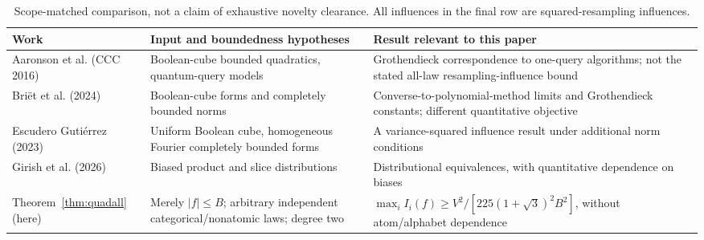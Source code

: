 \documentclass[11pt]{article}
\numberwithin{equation}{section}
\theoremstyle{remark}
\begin{document}
\begin{table}[ht]
\centering\footnotesize
\begin{tabular}{@{}>{\raggedright\arraybackslash}p{.235\linewidth}>{\raggedright\arraybackslash}p{.31\linewidth}>{\raggedright\arraybackslash}p{.355\linewidth}@{}}\toprule
Work & Input and boundedness hypotheses & Result relevant to this paper\\\midrule
Aaronson et al. (CCC 2016)~\cite{AAIKS16} & Boolean-cube bounded quadratics, quantum-query models & Grothendieck correspondence to one-query algorithms; not the stated all-law resampling-influence bound\\
Bri\"et et al. (2024)~\cite{BEG24} & Boolean-cube forms and completely bounded norms & Converse-to-polynomial-method limits and Grothendieck constants; different quantitative objective\\
Escudero Guti\'errez (2023)~\cite{EG23} & Uniform Boolean cube, homogeneous Fourier completely bounded forms & A variance-squared influence result under additional norm conditions\\
Girish et al. (2026)~\cite{GMNR26} & Biased product and slice distributions & Distributional equivalences, with quantitative dependence on biases\\
Theorem~\ref{thm:quadall} (here) & Merely $|f|\le B$; arbitrary independent categorical/nonatomic laws; degree two & $\max_i I_i(f)\ge V^2/[225(1+\sqrt3)^2B^2]$, without atom/alphabet dependence\\\bottomrule
\end{tabular}
\caption{Scope-matched comparison, not a claim of exhaustive novelty clearance. All influences in the final row are squared-resampling influences.}\label{tab:quadratic-prior}
\end{table}
\end{document}

